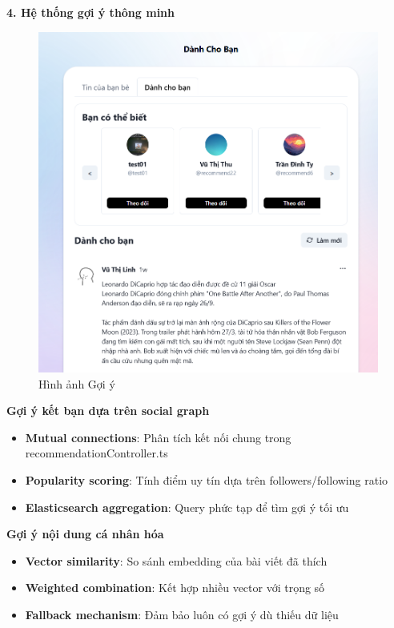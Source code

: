 \textbf{4. Hệ thống gợi ý thông minh}
\begin{figure}[H]
    \centering
    \includegraphics[width=1\textwidth]{image/thucnghiem/recommend.png}
    \caption{Hình ảnh Gợi ý}
    \label{fig:goi_y}
\end{figure}
\textbf{Gợi ý kết bạn dựa trên social graph}
\begin{itemize}
    \item \textbf{Mutual connections}: Phân tích kết nối chung trong recommendationController.ts
    \item \textbf{Popularity scoring}: Tính điểm uy tín dựa trên followers/following ratio
    \item \textbf{Elasticsearch aggregation}: Query phức tạp để tìm gợi ý tối ưu
\end{itemize}

\textbf{Gợi ý nội dung cá nhân hóa}
\begin{itemize}
    \item \textbf{Vector similarity}: So sánh embedding của bài viết đã thích
    \item \textbf{Weighted combination}: Kết hợp nhiều vector với trọng số
    \item \textbf{Fallback mechanism}: Đảm bảo luôn có gợi ý dù thiếu dữ liệu
\end{itemize}


